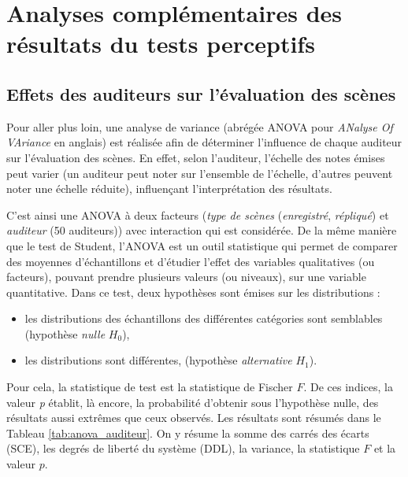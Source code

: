 \chapter{Analyses complémentaires des résultats du tests perceptifs}\label{annexe:anova}


\section{Effets des auditeurs sur l'évaluation des scènes}

Pour aller plus loin, une analyse de variance (abrégée ANOVA pour \textit{ANalyse Of VAriance} en anglais) est réalisée afin de déterminer l'influence de chaque auditeur sur l'évaluation des scènes. En effet, selon l'auditeur, l'échelle des notes émises peut varier (un auditeur peut noter sur l'ensemble de l'échelle, d'autres peuvent noter une échelle réduite), influençant l'interprétation des résultats.

C'est ainsi une ANOVA à deux facteurs (\textit{type de scènes} (\textit{enregistré}, \textit{répliqué}) et \textit{auditeur} (50 auditeurs)) avec interaction qui est considérée. De la même manière que le test de Student, l'ANOVA est un outil statistique qui permet de comparer des moyennes d'échantillons et d'étudier l'effet des variables qualitatives (ou facteurs), pouvant prendre plusieurs valeurs (ou niveaux), sur une variable quantitative. Dans ce test, deux hypothèses sont émises sur les distributions :

\begin{itemize}
\item les distributions des échantillons des différentes catégories sont semblables (hypothèse \textit{nulle} $H_0$),
\item les distributions sont différentes, (hypothèse \textit{alternative} $H_1$).\\
\end{itemize}

Pour cela, la statistique de test est la statistique de Fischer $F$. De ces indices, la valeur \textit{p} établit, là encore, la probabilité d'obtenir sous l'hypothèse nulle, des résultats aussi extrêmes que ceux observés. Les résultats sont résumés dans le Tableau \ref{tab:anova_auditeur}. On y résume la somme des carrés des écarts (SCE), les degrés de liberté du système (DDL), la variance, la statistique $F$ et la valeur $p$.

